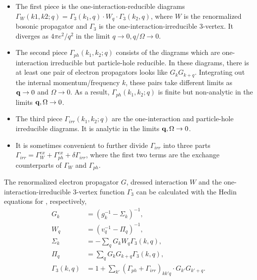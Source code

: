\documentclass[reprint,amsmath,amssymb,aps,prb]{revtex4-1}
\begin{document}
\begin{itemize}
    \item The first piece is the one-interaction-reducible diagrams $\Gamma_W (k1, k2; q)=\Gamma_3(k_1, q) \cdot W_q \cdot \Gamma_3(k_2, q)$, where $W$ is the renormalized bosonic propagator and $\Gamma_3$ is the one-interaction-irreducible $3$-vertex. It diverges as $4\pi e^2/q^2$ in the limit $q\rightarrow 0, q/\Omega \rightarrow 0$.
    \item The second piece $\Gamma_{ph}(k_1, k_2; q)$ consists of the diagrams which are one-interaction irreducible but particle-hole reducible. In these diagrams, there is at least one pair of electron propagators looks like $G_k G_{k+q}$. Integrating out the internal momentum/frequency $k$, these pairs take different limits as $\mathbf{q}\rightarrow 0$ and $\Omega \rightarrow 0$. As a result, $\Gamma_{ph}(k_1, k_2; q)$ is finite but non-analytic in the limits $\mathbf{q}, \Omega \rightarrow 0$.

    \item The third piece $\Gamma_{irr}(k_1, k_2; q)$ are the one-interaction and particle-hole irreducible diagrams. It is analytic in the limits $\mathbf{q}, \Omega \rightarrow 0$.

    \item It is sometimes convenient to further divide $\Gamma_{irr}$ into three parts $\Gamma_{irr}=\Gamma_W^{ex}+\Gamma_{ph}^{ex}+\delta \Gamma_{irr}$, where the first two terms are the exchange counterparts of $\Gamma_W$ and $\Gamma_{ph}$.
\end{itemize}



The renormalized electron propagator $G$, dressed interaction $W$ and the one-interaction-irreducible $3$-vertex function $\Gamma_3$ can be calculated with the Hedin equations for , respectively,
\begin{align}
    G_k            & =(g^{-1}_k-\Sigma_k)^{-1},                                           \\
    W_q            & =(v_q^{-1}-\Pi_q)^{-1},                                              \\
    \Sigma_k       & =-\sum_q G_k W_q \Gamma_3(k, q),                                     \\
    \label{eq:polar}
    \Pi_q          & =\sum_q G_k G_{k+q} \Gamma_3(k, q),                                  \\
    \Gamma_3(k, q) & =1+\sum_{k'} (\Gamma_{ph}+\Gamma_{irr})_{kk'q}\cdot G_{k'} G_{k'+q}.
\end{align}
\end{document}
